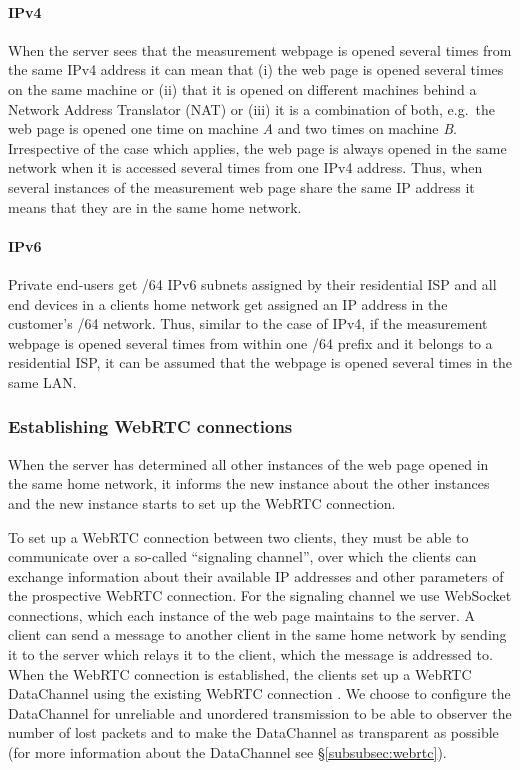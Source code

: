 \documentclass{sig-alternate-10pt}
\begin{document}
\paragraph{IPv4}When the server sees that the measurement webpage is opened several times from the same IPv4 address it can mean that (i) the web page is opened several times on the same machine or (ii) that it is opened on different machines behind a Network Address Translator (NAT) or (iii) it is a combination of both, e.g.~the web page is opened one time on machine \textit{A} and two times on machine \textit{B}. Irrespective of the case which applies, the web page is always opened in the same network when it is accessed several times from one IPv4 address. Thus, when several instances of the measurement web page share the same IP address it means that they are in the same home network.

\paragraph{IPv6}Private end-users get /64 IPv6 subnets assigned by their residential ISP \cite{ripe_understanding_2015} and all end devices in a clients home network get assigned an IP address in the customer's /64 network. %
Thus, similar to the case of IPv4, if the measurement webpage is opened several times from within one /64 prefix and it belongs to a residential ISP, it can be assumed that the webpage is opened several times in the same LAN. 

\subsubsection{Establishing WebRTC connections}

When the server has determined all other instances of the web page opened in the same home network, it informs the new instance about the other instances and the new instance starts to set up the WebRTC connection. 

To set up a WebRTC connection between two clients, they must be able to communicate over a so-called ``signaling channel'', over which the clients can exchange information about their available IP addresses and other parameters of the prospective WebRTC connection. For the signaling channel we use WebSocket connections, which each instance of the web page maintains to the server. A client can send a message to another client in the same home network by sending it to the server which relays it to the client, which the message is addressed to. When the WebRTC connection is established, the clients set up a WebRTC DataChannel using the existing WebRTC connection \cite{k._drage_sdp-based_2016}. We choose to configure the DataChannel for unreliable and unordered transmission to be able to observer the number of lost packets and to make the DataChannel as transparent as possible (for more information about the DataChannel see \S\ref{subsubsec:webrtc}).
\end{document}

